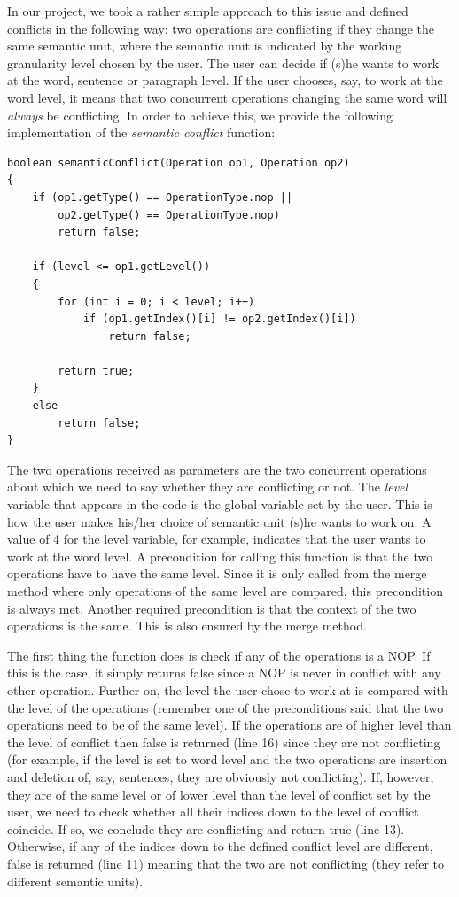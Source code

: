 In our project, we took a rather simple approach to this issue and defined conflicts in the
following way: two operations are conflicting if they change the same semantic unit, where
the semantic unit is indicated by the working granularity level chosen by the user.
The user can decide if (s)he wants to work at the word, sentence or paragraph level. If the
user chooses, say, to work at the word level, it means that two concurrent operations changing
the same word will \emph{always} be conflicting. In order to achieve this, we provide the
following implementation of the \emph{semantic conflict} function:

\lstset{linewidth=340pt}
\begin{lstlisting}
boolean semanticConflict(Operation op1, Operation op2)
{
	if (op1.getType() == OperationType.nop ||
		op2.getType() == OperationType.nop)
		return false;

	if (level <= op1.getLevel())
	{
		for (int i = 0; i < level; i++)
			if (op1.getIndex()[i] != op2.getIndex()[i])
				return false;
				
		return true;
	}
	else
		return false;
}
\end{lstlisting}
\lstset{linewidth=450pt}

The two operations received as parameters are the two concurrent operations about which we need
to say whether they are conflicting or not. The \emph{level} variable that appears in the
code is the global variable set by the user. This is how the user makes his/her choice of
semantic unit (s)he wants to work on. A value of 4 for the level variable, for example,
indicates that the user wants to work at the word level. A precondition for calling this function
is that the two operations have to have the same level. Since it is only called from the
merge method where only operations of the same level are compared, this precondition is
always met. Another required precondition is that the context of the two operations is
the same. This is also ensured by the merge method.

The first thing the function does is check if any of the operations is a NOP. If this is
the case, it simply returns false since a NOP is never in conflict with any other operation.
Further on, the level the user chose to work at is compared with the level of the operations
(remember one of the preconditions said that the two operations need to be of the same level).
If the operations are of higher level than the level of conflict then false is returned (line
16) since they are not conflicting (for example, if the level is set to word level and the
two operations are insertion and deletion of, say, sentences, they are obviously not conflicting).
If, however, they are of the same level or of lower level than the level of conflict set by the
user, we need to check whether all their indices down to the level of conflict coincide. If so,
we conclude they are conflicting and return true (line 13). Otherwise, if any of the indices
down to the defined conflict level are different, false is returned (line 11) meaning that the
two are not conflicting (they refer to different semantic units).

